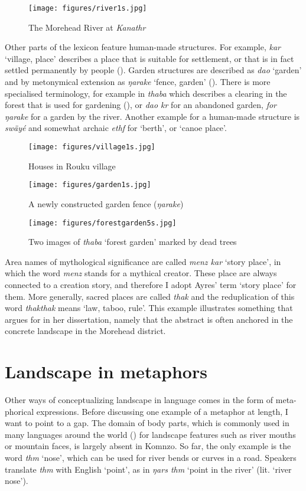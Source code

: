\begin{figure}
        \texttt{[image: figures/river1s.jpg]}
    \caption{The Morehead River at \textit{Kanathr}}
    \label{fig:moreheadriver}
\end{figure}

Other parts of the lexicon feature human-made structures. For example, \textit{kar} `village, place' describes a place that is suitable for settlement, or that is in fact settled permanently by people (). Garden structures are described as \textit{dao} `garden' and by metonymical extension as \textit{ŋarake} `fence, garden' (). There is more specialised terminology, for example in \textit{thaba} which describes a clearing in the forest that is used for gardening (), or \textit{dao kr} for an abandoned garden, \textit{for ŋarake} for a garden by the river. Another example for a human-made structure is \textit{swäyé} and somewhat archaic \textit{ethf} for `berth', or `canoe place'.

\begin{figure}
        \texttt{[image: figures/village1s.jpg]}
    \caption{Houses in Rouku village}
    \label{fig:rouku}
\end{figure}
\begin{figure}
    \texttt{[image: figures/garden1s.jpg]}
    \caption{A newly constructed garden fence (\textit{ŋarake})}
    \label{fig:fence}
\end{figure}
\begin{figure}
        \texttt{[image: figures/forestgarden5s.jpg]}
    \caption{Two images of \textit{thaba} `forest garden' marked by dead trees}
    \label{fig:thaba}
\end{figure}

Area names of mythological significance are called \textit{menz kar} `story place', in which the word \textit{menz} stands for a mythical creator. These place are always connected to a creation story, and therefore I adopt Ayres' term `story place' for them. More generally, sacred places are called \textit{thak} and the reduplication of this word \textit{thakthak} means `law, taboo, rule'. This example illustrates something that \textcite{Ayres:1983dw} argues for in her dissertation, namely that the abstract is often anchored in the concrete landscape in the Morehead district.

\section{Landscape in metaphors}\label{landmetaphor}
Other ways of conceptualizing landscape in language comes in the form of meta-phorical expressions. Before discussing one example of a metaphor at length, I want to point to a gap. The domain of body parts, which is commonly used in many languages around the world (\cite{Tjuka:2019if}) for landscape features such as river mouths or mountain faces, is largely absent in Komnzo. So far, the only example is the word \textit{thm} `nose', which can be used for river bends or curves in a road. Speakers translate \textit{thm} with English `point', as in \textit{ŋars thm} `point in the river' (lit. `river nose'). 

